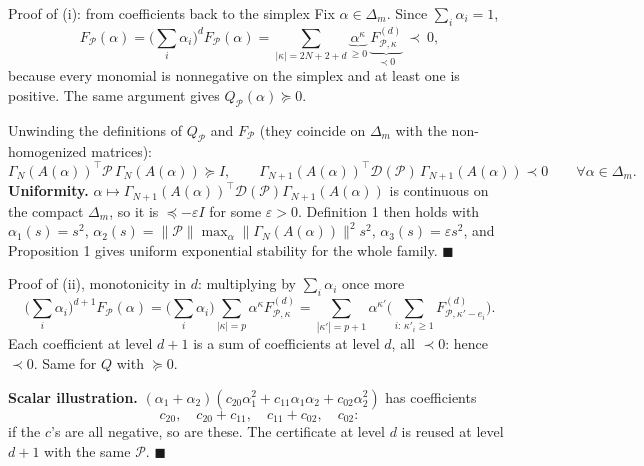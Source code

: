 \documentclass[10pt,aspectratio=169]{beamer}
\newcommand{\tr}{^{\top}}
\newcommand{\PP}{\mathcal{P}}
\newcommand{\DD}{\mathcal{D}}
\begin{document}
\begin{frame}{Proof of (i): from coefficients back to the simplex}
Fix $\alpha\in\Delta_m$. Since $\sum_i\alpha_i=1$,
\[
F_\PP(\alpha)=\Big(\sum_i\alpha_i\Big)^dF_\PP(\alpha)=\sum_{|\kappa|=2N+2+d}\underbrace{\alpha^\kappa}_{\ge0}\ \underbrace{F^{(d)}_{\PP,\kappa}}_{\prec0}\ \prec\ 0 ,
\]
because every monomial is nonnegative on the simplex and at least one is positive. The same argument gives $Q_\PP(\alpha)\succeq0$.
\medskip

Unwinding the definitions of $Q_\PP$ and $F_\PP$ (they coincide on $\Delta_m$ with the non-homogenized matrices):
\[
\Gamma_N(A(\alpha))\tr\PP\,\Gamma_N(A(\alpha))\succeq I,\qquad \Gamma_{N+1}(A(\alpha))\tr\DD(\PP)\,\Gamma_{N+1}(A(\alpha))\prec0\qquad\forall\alpha\in\Delta_m .
\]
\medskip
\textbf{Uniformity.} $\alpha\mapsto\Gamma_{N+1}(A(\alpha))\tr\DD(\PP)\Gamma_{N+1}(A(\alpha))$ is continuous on the compact $\Delta_m$, so it is $\preceq-\varepsilon I$ for some $\varepsilon>0$. Definition 1 then holds with $\alpha_1(s)=s^2$, $\alpha_2(s)=\|\PP\|\max_\alpha\|\Gamma_N(A(\alpha))\|^2s^2$, $\alpha_3(s)=\varepsilon s^2$, and Proposition 1 gives uniform exponential stability for the whole family. $\blacksquare$
\end{frame}

\begin{frame}{Proof of (ii), monotonicity in $d$: multiplying by $\sum_i\alpha_i$ once more}
\[
\Big(\sum_i\alpha_i\Big)^{d+1}F_\PP(\alpha)=\Big(\sum_i\alpha_i\Big)\sum_{|\kappa|=p}\alpha^\kappa F^{(d)}_{\PP,\kappa}
=\sum_{|\kappa'|=p+1}\alpha^{\kappa'}\Big(\sum_{i:\,\kappa'_i\ge1}F^{(d)}_{\PP,\kappa'-e_i}\Big).
\]
Each coefficient at level $d+1$ is a \alert{sum} of coefficients at level $d$, all $\prec0$: hence $\prec0$. Same for $Q$ with $\succeq0$.
\medskip

\textbf{Scalar illustration.} $(\alpha_1+\alpha_2)(c_{20}\alpha_1^2+c_{11}\alpha_1\alpha_2+c_{02}\alpha_2^2)$ has coefficients
\[
c_{20},\quad c_{20}+c_{11},\quad c_{11}+c_{02},\quad c_{02}:
\]
if the $c$'s are all negative, so are these. The certificate at level $d$ is reused at level $d+1$ with the same $\PP$. $\blacksquare$
\end{frame}
\end{document}
